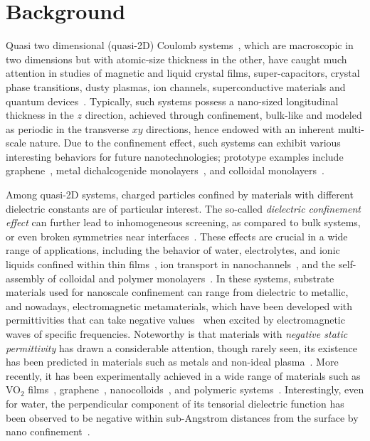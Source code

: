 \section{Background}

Quasi two dimensional (quasi-2D) Coulomb systems~\cite{mazars2011long}, which are macroscopic in two dimensions but with atomic-size thickness in the other, have caught much attention in studies of magnetic and liquid crystal films, super-capacitors, crystal phase transitions, dusty plasmas, ion channels, superconductive materials and quantum devices~\cite{kawamoto2002history, hille2001ionic, teng2003microscopic, Messina2017PRL, mazars2011long, saito2016highly, liu20192d}. 
Typically, such systems possess a nano-sized longitudinal thickness in the $z$ direction, achieved through confinement, bulk-like and modeled as periodic in the transverse $xy$ directions, hence endowed with an inherent multi-scale nature.
Due to the confinement effect, such systems can exhibit various interesting behaviors for future nanotechnologies; prototype examples include graphene~\cite{novoselov2004electric}, metal dichalcogenide monolayers~\cite{kumar2012tunable}, and colloidal monolayers~\cite{mangold2003phase}.

Among quasi-2D systems, charged particles confined by materials with different dielectric constants are of particular interest. 
The so-called \emph{dielectric confinement effect} can further lead to inhomogeneous screening, as compared to bulk systems, or even broken symmetries near interfaces~\cite{C0NR00698J,wang2016inhomogeneous,gao2024broken}.
These effects are crucial in a wide range of applications, including the behavior of water, electrolytes, and ionic liquids confined within thin films~\cite{raviv2001fluidity}, ion transport in nanochannels~\cite{zhu2019ion}, and the self-assembly of colloidal and polymer monolayers~\cite{kim2017imaging}.
In these systems, substrate materials used for nanoscale confinement can range from dielectric to metallic, and nowadays, electromagnetic metamaterials, which have been developed with permittivities that can take negative values~\cite{veselago1967electrodynamics, smith2004metamaterials, cheng2017tunable, xie2022recent, xu2020polyaniline} when excited by electromagnetic waves of specific frequencies.  
Noteworthy is that materials with \emph{negative static permittivity}  has drawn a considerable attention, though rarely seen, its existence has been predicted in materials such as metals and non-ideal plasma~\cite{Dolgov1918admissible,homes2001optical}. More recently, it has been experimentally achieved in a wide range of materials such as VO$_2$ films~\cite{kana2016thermally}, graphene~\cite{nazarov2015negative}, nanocolloids~\cite{shulman2007plasmalike}, and polymeric systems~\cite{yan2013negative}.
Interestingly, even for water, the perpendicular component of its tensorial dielectric function has been observed to be negative within sub-Angstrom distances from the surface by nano confinement~\cite{Kornyshev1996Static, Schlaich2016Water, Kornyshev2021Nonlocal}.


